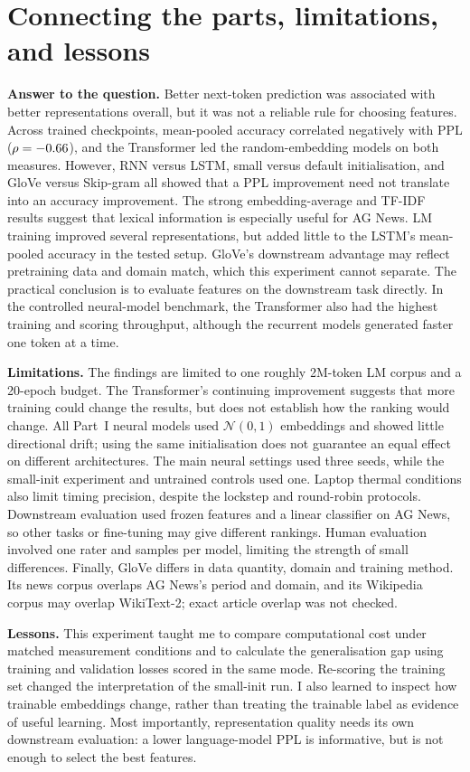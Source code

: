 \documentclass[10pt]{article}
\begin{document}
\section{Connecting the parts, limitations, and lessons}
\textbf{Answer to the question.} Better next-token prediction was associated with better representations overall,
but it was not a reliable rule for choosing features. Across \nAll{} trained checkpoints, mean-pooled accuracy
correlated negatively with PPL ($\rho=-0.66$), and the Transformer led the random-embedding models on both
measures. However, RNN versus LSTM, small versus default initialisation, and GloVe versus Skip-gram all showed that
a PPL improvement need not translate into an accuracy improvement. The strong embedding-average and TF-IDF results
suggest that lexical information is especially useful for AG News. LM training improved several representations,
but added little to the LSTM's mean-pooled accuracy in the tested setup. GloVe's downstream advantage may reflect
pretraining data and domain match, which this experiment cannot separate. The practical conclusion is to evaluate
features on the downstream task directly. In the controlled neural-model benchmark, the Transformer also had the
highest training and scoring throughput, although the recurrent models generated faster one token at a time.

\textbf{Limitations.} The findings are limited to one roughly 2M-token LM corpus and a 20-epoch budget. The
Transformer's continuing improvement suggests that more training could change the results, but does not establish
how the ranking would change. All Part~I neural models used $\mathcal N(0,1)$ embeddings and showed little
directional drift; using the same initialisation does not guarantee an equal effect on different architectures. The
main neural settings used three seeds, while the small-init experiment and untrained controls used one. Laptop
thermal conditions also limit timing precision, despite the lockstep and round-robin protocols. Downstream
evaluation used frozen features and a linear classifier on AG News, so other tasks or fine-tuning may give different
rankings. Human evaluation involved one rater and \heItems{} samples per model, limiting the strength of small
differences. Finally, GloVe differs in data quantity, domain and training method. Its news corpus overlaps AG News's
period and domain, and its Wikipedia corpus may overlap WikiText-2; exact article overlap was not checked.

\textbf{Lessons.} This experiment taught me to compare computational cost under matched measurement conditions and
to calculate the generalisation gap using training and validation losses scored in the same mode. Re-scoring the
training set changed the interpretation of the small-init run. I also learned to inspect how trainable embeddings
change, rather than treating the trainable label as evidence of useful learning. Most importantly, representation
quality needs its own downstream evaluation: a lower language-model PPL is informative, but is not enough to select
the best features.
\end{document}
